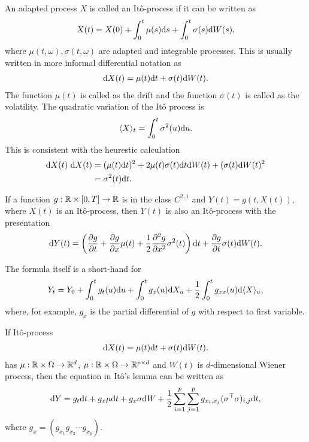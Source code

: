 An adapted process $X$ is called an It\^{o}-process if it can be written as
  \begin{align}
    X(t) = X(0) + \int_0^t \mu(s) \mathrm{d} s + \int_0^t \sigma(s) \mathrm{d} W(s) ,
  \end{align}
where $\mu(t, \omega), \sigma(t, \omega)$ are adapted and integrable processes. This is usually written in more informal differential notation as
  \begin{align}
    \mathrm{d} X(t) = \mu(t) \mathrm{d} t + \sigma(t) \mathrm{d} W(t) .
  \end{align}
The function $\mu(t)$ is called as the drift and the function $\sigma(t)$ is called as the volatility. The quadratic variation of the It\^{o} process is
  \begin{align}
    \langle X \rangle_t = \int_0^t \sigma^2(u) \mathrm{d} u .
  \end{align}
This is consistent with the heurestic calculation
  \begin{align}
    \mathrm{d} X(t) \ \mathrm{d} X(t) &= ( \mu(t) \mathrm{d} t )^2 + 2 \mu(t) \sigma(t) \mathrm{d} t \mathrm{d} W(t) + ( \sigma(t) \mathrm{d} W(t )^2 \\
      &= \sigma^2 (t) \mathrm{d} t .
  \end{align}

\begin{thm}[It\^{o}'s lemma]
If a function $g : \mathbb{R} \times [0,T] \rightarrow \mathbb{R}$ is in the class $C^{2,1}$ and $Y(t) = g(t, X(t))$, where $X(t)$ is an It\^{o}-process, then $Y(t)$ is also an It\^{o}-process with the presentation
  \begin{align}
    \mathrm{d} Y(t) = \left( \frac{\partial g}{\partial t} + \frac{\partial g}{\partial x} \mu(t) + \frac{1}{2} \frac{\partial^2 g}{\partial x^2} \sigma^2(t) \right) \mathrm{d} t + \frac{\partial g}{\partial t} \sigma(t) \mathrm{d} W(t) .
  \end{align}
\end{thm}

The formula itself is a short-hand for
  \begin{align}
    Y_t = Y_0 + \int_0^t g_t (u) \mathrm{d} u + \int_0^t g_x (u) \mathrm{d} X_u + \frac{1}{2} \int_0^t g_{xx} (u) \mathrm{d} \langle X \rangle_u ,
  \end{align}
where, for example, $g_x$ is the partial differential of $g$ with respect to first variable.

If It\^{o}-process
	\begin{align}
		\mathrm{d} X(t) = \mu(t) \mathrm{d} t + \sigma(t) \mathrm{d} W(t) .
	\end{align}
has $\mu: \mathbb{R} \times \Omega \rightarrow \mathbb{R}^d$, $\mu: \mathbb{R} \times \Omega \rightarrow \mathbb{R}^{p \times d}$ and $W(t)$ is $d$-dimensional Wiener process, then the equation in It\^{o}'s lemma can be written as
	\begin{align}
		\mathrm{d} Y = g_t \mathrm{d} t + g_x \mu \mathrm{d} t + g_x \sigma \mathrm{d} W + \frac{1}{2} \sum_{i=1}^p \sum_{j=1}^p g_{x_i, x_j} (\sigma^{\top} \sigma)_{i,j} \mathrm{d} t ,
	\end{align}
where $g_x = \left( g_{x_1} g_{x_2} \cdots g_{x_p}  \right)$.

